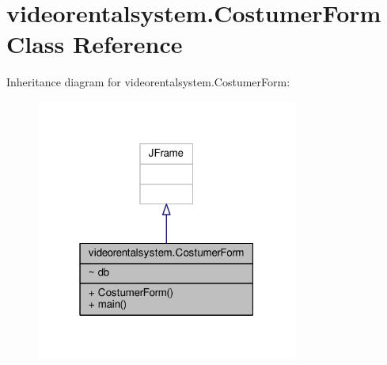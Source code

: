 \hypertarget{classvideorentalsystem_1_1CostumerForm}{\section{videorentalsystem.\-Costumer\-Form Class Reference}
\label{classvideorentalsystem_1_1CostumerForm}
}


Inheritance diagram for videorentalsystem.\-Costumer\-Form\-:
\nopagebreak
\begin{figure}[H]
\begin{center}
\leavevmode
\includegraphics[width=244pt]{classvideorentalsystem_1_1CostumerForm__inherit__graph}
\end{center}
\end{figure}



